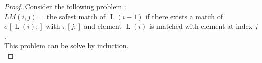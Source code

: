 \documentclass[a4paper]{llncs}
\newcommand{\ptext}{\pi}
\newcommand{\pmotif}{\sigma}
\DeclareMathOperator{\firsta}{L}
\newcommand{\first}[1]{\firsta({#1})}
\DeclareMathOperator{\factora}{F}
\newcommand{\factor}[1]{\factora({#1})}
\begin{document}
\begin{proof}%
%
%

Consider the following problem :\\
$LM(i,j)$ = the safest match of $\first{i-1}$
	if there exists a match of $\pmotif[\first{i}:]$
	with $\ptext[j:]$
	and element $\first{i}$
	is matched with element at index $j$.\\

This problem can be solve by induction.\\




\end{proof}
\end{document}
